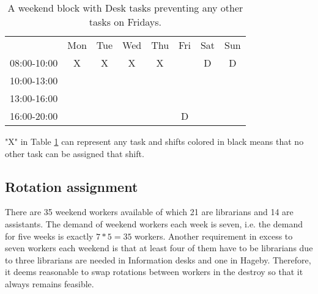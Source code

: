 \begin{table}[!h]
\centering
\caption{A weekend block with Desk tasks preventing any other tasks on Fridays.}
\label{Friday_percolation}
\begin{tabular}{cccccccc}
                                 & Mon                    & Tue                    & Wed                    & Thu                    & Fri                                            & Sat                                            & Sun                                            \\ \cline{2-8} 
\multicolumn{1}{c|}{08:00-10:00} & \multicolumn{1}{c|}{X} & \multicolumn{1}{c|}{X} & \multicolumn{1}{c|}{X} & \multicolumn{1}{c|}{X} & \multicolumn{1}{c|}{\cellcolor[HTML]{000000}}  & \multicolumn{1}{c|}{\cellcolor[HTML]{FCFF2F}D} & \multicolumn{1}{c|}{\cellcolor[HTML]{FCFF2F}D} \\ \cline{2-8} 
\multicolumn{1}{c|}{10:00-13:00} & \multicolumn{1}{c|}{}  & \multicolumn{1}{c|}{}  & \multicolumn{1}{c|}{}  & \multicolumn{1}{c|}{}  & \multicolumn{1}{c|}{\cellcolor[HTML]{000000}}  &                                                &                                                \\ \cline{2-6}
\multicolumn{1}{c|}{13:00-16:00} & \multicolumn{1}{c|}{}  & \multicolumn{1}{c|}{}  & \multicolumn{1}{c|}{}  & \multicolumn{1}{c|}{}  & \multicolumn{1}{c|}{\cellcolor[HTML]{000000}}  &                                                &                                                \\ \cline{2-6}
\multicolumn{1}{c|}{16:00-20:00} & \multicolumn{1}{c|}{}  & \multicolumn{1}{c|}{}  & \multicolumn{1}{c|}{}  & \multicolumn{1}{c|}{}  & \multicolumn{1}{c|}{\cellcolor[HTML]{FCFF2F}D} &                                                &                                                \\ \cline{2-6}
\end{tabular}
\end{table}

 "X" in Table \ref{Friday_percolation} can represent any task and shifts colored in black means that no other task can be assigned that shift.

\subsection{Rotation assignment} \label{rotation}
There are 35 weekend workers available of which 21 are librarians and 14 are assistants. The demand of weekend workers each week is seven, i.e. the demand for five weeks is exactly $7*5 = 35$ workers. Another requirement in excess to seven workers each weekend is that at least four of them have to be librarians due to three librarians are needed in Information desks and one in Hageby. Therefore, it deems reasonable to swap rotations between workers in the destroy so that it always remains feasible. 

